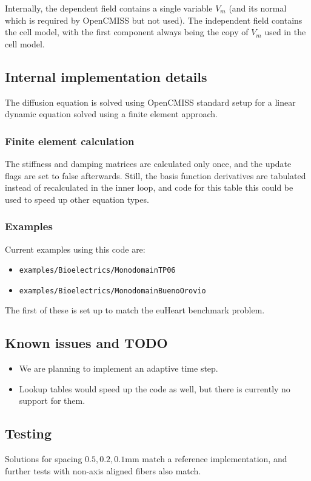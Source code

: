 Internally, the dependent field contains a single variable $V_m$ (and its normal which is required by OpenCMISS but not used). The independent
field contains the cell model, with the first component always being the copy of $V_m$ used in the cell model.

\subsection{Internal implementation details}
The diffusion equation is solved using OpenCMISS standard setup for a linear dynamic equation solved using a finite element approach.
\subsubsection{Finite element calculation}
The stiffness and damping matrices are calculated only once, and the update flags are set to false afterwards.
Still, the basis function derivatives are tabulated instead of recalculated in the inner loop, and code for this table this could be used to speed up other equation types.


\subsubsection{Examples}
Current examples using this code are:
\begin{itemize}
 \item \verb!examples/Bioelectrics/MonodomainTP06!
 \item \verb!examples/Bioelectrics/MonodomainBuenoOrovio!
\end{itemize}
The first of these is set up to match the euHeart benchmark problem.

\subsection{Known issues and TODO}
\begin{itemize}
 \item We are planning to implement an adaptive time step.
 \item Lookup tables would speed up the code as well, but there is currently no support for them.
\end{itemize}

\subsection{Testing}
Solutions for spacing $0.5, 0.2, 0.1$mm match a reference implementation, and further tests
with non-axis aligned fibers also match.



